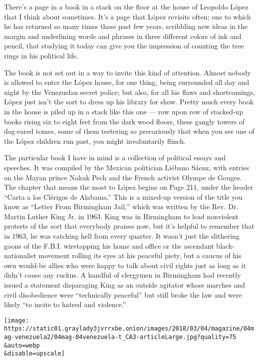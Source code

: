 There's a page in a book in a stack on the floor at the house of
Leopoldo López that I think about sometimes. It's a page that López
revisits often; one to which he has returned so many times these past
few years, scribbling new ideas in the margin and underlining words and
phrases in three different colors of ink and pencil, that studying it
today can give you the impression of counting the tree rings in his
political life.

The book is not set out in a way to invite this kind of attention.
Almost nobody is allowed to enter the López house, for one thing, being
surrounded all day and night by the Venezuelan secret police; but also,
for all his flaws and shortcomings, López just isn't the sort to dress
up his library for show. Pretty much every book in the house is piled up
in a stack like this one --- row upon row of stacked-up books rising six
to eight feet from the dark wood floors, these gangly towers of
dog-eared tomes, some of them teetering so precariously that when you
see one of the López children run past, you might involuntarily flinch.

The particular book I have in mind is a collection of political essays
and speeches. It was compiled by the Mexican politician Liébano Sáenz,
with entries on the Mayan prince Nakuk Pech and the French activist
Olympe de Gouges. The chapter that means the most to López begins on
Page 211, under the header ``Carta a los Clérigos de Alabama.'' This is
a mixed-up version of the title you know as ``Letter From Birmingham
Jail,'' which was written by the Rev. Dr. Martin Luther King Jr. in
1963. King was in Birmingham to lead nonviolent protests of the sort
that everybody praises now, but it's helpful to remember that in 1963,
he was catching hell from every quarter. It wasn't just the slithering
goons of the F.B.I. wiretapping his home and office or the ascendant
black-nationalist movement rolling its eyes at his peaceful piety, but a
caucus of his own would-be allies who were happy to talk about civil
rights just as long as it didn't cause any ruckus. A handful of
clergymen in Birmingham had recently issued a statement disparaging King
as an outside agitator whose marches and civil disobedience were
``technically peaceful'' but still broke the law and were likely ``to
incite to hatred and violence.''

\texttt{[image: https://static01.graylady3jvrrxbe.onion/images/2018/03/04/magazine/04mag-venezuela2/04mag-04venezuela-t\_CA3-articleLarge.jpg?quality=75\\\&auto=webp\\\&disable=upscale]}

